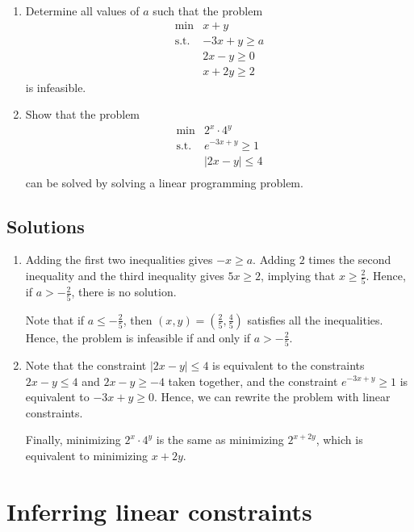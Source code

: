 \documentclass[]{book}
\def\gt{>}
\theoremstyle{definition}
\theoremstyle{definition}
\theoremstyle{remark}
\begin{document}
\begin{enumerate}
\def\labelenumi{\arabic{enumi}.}
\item
  Determine all values of \(a\) such that the problem \[
  \begin{array}{rl}
  \min & x + y \\
  \text{s.t.} 
  &  -3x + y \geq a \\
  &  2x - y \geq 0 \\
  & x + 2y \geq 2
  \end{array}
  \] is infeasible.
\item
  Show that the problem \[
  \begin{array}{rl}
  \min & 2^x \cdot 4^y \\
  \text{s.t.} 
  &  e^{-3x + y} \geq 1 \\
  &  |2x - y| \leq 4 \\
  \end{array}
  \] can be solved by solving a linear programming problem.
\end{enumerate}

\section*{Solutions}\label{solutions-1}

\begin{enumerate}
\def\labelenumi{\arabic{enumi}.}
\item
  Adding the first two inequalities gives \(-x \geq a\). Adding \(2\)
  times the second inequality and the third inequality gives
  \(5x \geq 2\), implying that \(x \geq \frac{2}{5}\). Hence, if
  \(a \gt -\frac{2}{5}\), there is no solution.

  Note that if \(a \leq -\frac{2}{5}\), then
  \((x,y) = \left (\frac{2}{5}, \frac{4}{5}\right)\) satisfies all the
  inequalities. Hence, the problem is infeasible if and only if
  \(a \gt -\frac{2}{5}\).
\item
  Note that the constraint \(|2x - y| \leq 4\) is equivalent to the
  constraints \(2x-y\leq 4\) and \(2x-y \geq -4\) taken together, and
  the constraint \(e^{-3x+y} \geq 1\) is equivalent to \(-3x+y \geq 0\).
  Hence, we can rewrite the problem with linear constraints.

  Finally, minimizing \(2^x \cdot 4^y\) is the same as minimizing
  \(2^{x + 2y}\), which is equivalent to minimizing \(x+2y\).
\end{enumerate}

\chapter{Inferring linear
constraints}\label{inferring-linear-constraints}
\end{document}
